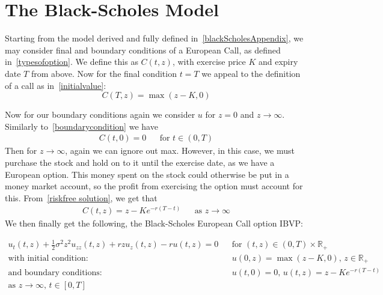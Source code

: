 \documentclass[11pt]{article} %
\begin{document}
\section{The Black-Scholes Model}
Starting from the model derived and fully defined in~\ref{blackScholesAppendix}, we may consider final and boundary 
conditions of a European Call, as defined in~\ref{typesofoption}. We define this as 
$C(t,z)$, with exercise price $K$ and expiry date $T$ from above. Now for the final 
condition $t=T$ we appeal to the definition of a call as in~\eqref{initialvalue}:
\begin{equation}
    C(T, z) = \max{(z-K, 0)}
\end{equation}

Now for our boundary conditions again we consider $u$ for $z=0$ and $z \to \infty$. Similarly 
to~\eqref{boundarycondition} we have 
\begin{align}
    C(t, 0) = 0 &&\text{for } t \in (0,T)
\end{align}
Then for $z \to \infty$, again we can ignore out max. However, in this case, we must 
purchase the stock and hold on to it until the exercise date, as we have a 
European option. This money spent on the stock could otherwise be put in a 
money market account, so the profit from exercising the option must account for this.
From~\eqref{riskfree solution}, we get that 
\begin{align}
    C(t,z) = z - Ke^{-r(T-t)} &&\text{as } z \to \infty
\end{align}
We then finally get the following, the Black-Scholes European Call option IBVP:

\begin{align}
    u_t(t,z) +\frac{1}{2}\sigma^2z^2u_{zz}(t,z) + rzu_z(t,z) - ru(t,z) = 0 &&
    \text{for $(t,z) \in (0,T) \times \mathbb{R}_+ $}\\
    \text{with initial condition: } &&
     u(0,z) = \max{(z-K, 0)} \text{, } z \in \mathbb{R}_+ \\
    \text{and boundary conditions: } && 
    u(t, 0) = 0 \text{,  $u(t,z) = z - Ke^{-r(T-t)}$}\\
    \text{as $z \to \infty $,  $t \in [0,T]$}
\end{align}
\end{document}
